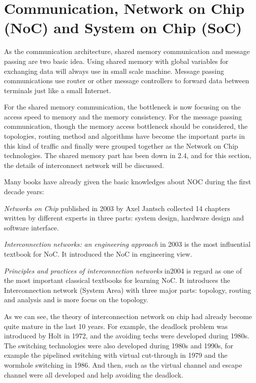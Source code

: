 \section{Communication, Network on Chip (NoC) and System on Chip (SoC)}
\par As the communication architecture, shared memory communication and message passing are two basic idea. Using shared memory with global variables for exchanging data will always use in small scale machine. Message passing communications use router or other message controllers to forward data between terminals just like a small Internet. 
\par For the shared memory communication, the bottleneck is now focusing on the access speed to memory and the memory consistency. For the message passing communication, though the memory access bottleneck should be considered, the topologies, routing method and algorithms have become the important parts in this kind of traffic and finally were grouped together as the Network on Chip technologies. The shared memory part has been down in 2.4, and for this section, the details of interconnect network will be discussed. 
\par Many books have already given the basic knowledges about NOC during the first decade years\cite{hennessy2017computer}:
\par \textit{Networks on Chip}\cite{jantsch2003networks} published in 2003 by Axel Jantsch collected 14 chapters written by different experts in three parts: system design, hardware design and software interface.
\par \textit{Interconnection networks: an engineering approach}\cite{duato2003interconnection} in 2003 is the most influential textbook for NoC. It introduced the NoC in engineering view.
\par \textit{Principles and practices of interconnection networks}\cite{dally2004principles} in2004 is regard as one of the most important classical textbooks for learning NoC. It introduces the Interconnection network (System Area) with three major parts: topology, routing and analysis and is more focus on the topology.
\par As we can see, the theory of interconnection network on chip had already become quite mature in the last 10 years. For example, the deadlock problem was introduced by Holt in 1972\cite{holt1972some}, and the avoiding techs were developed during 1980s\cite{merolla2014million}\cite{gunther1981prevention}\cite{dally1987deadlock}. The switching technologies were also developed during 1980s and 1990s, for example the pipelined switching with virtual cut-through\cite{kermani1979virtual} in 1979 and the wormhole switching\cite{dally1986torus} in 1986. And then, such as the virtual channel and escape channel were all developed and help avoiding the deadlock.
